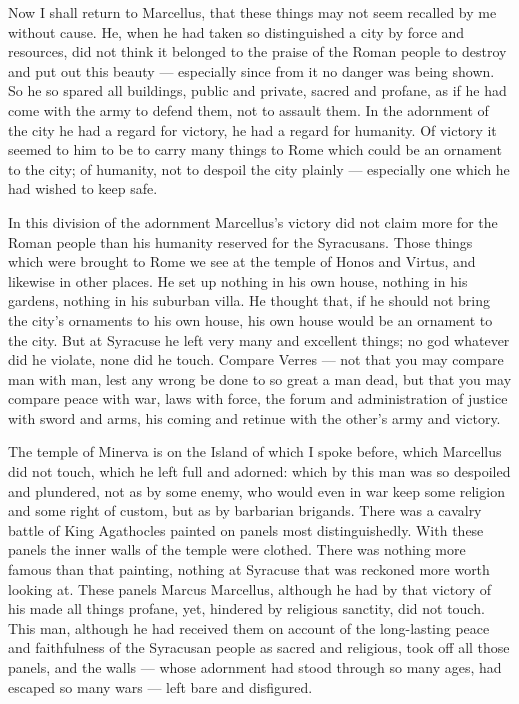  Now I shall return to Marcellus, that these things may not seem recalled by me without cause. He, when he had taken so distinguished a city by force and resources, did not think it belonged to the praise of the Roman people to destroy and put out this beauty --- especially since from it no danger was being shown. So he so spared all buildings, public and private, sacred and profane, as if he had come with the army to defend them, not to assault them. In the adornment of the city he had a regard for victory, he had a regard for humanity. Of victory it seemed to him to be to carry many things to Rome which could be an ornament to the city; of humanity, not to despoil the city plainly --- especially one which he had wished to keep safe.

 In this division of the adornment Marcellus's victory did not claim more for the Roman people than his humanity reserved for the Syracusans. Those things which were brought to Rome we see at the temple of Honos and Virtus, and likewise in other places. He set up nothing in his own house, nothing in his gardens, nothing in his suburban villa. He thought that, if he should not bring the city's ornaments to his own house, his own house would be an ornament to the city. But at Syracuse he left very many and excellent things; no god whatever did he violate, none did he touch. Compare Verres --- not that you may compare man with man, lest any wrong be done to so great a man dead, but that you may compare peace with war, laws with force, the forum and administration of justice with sword and arms, his coming and retinue with the other's army and victory.

 The temple of Minerva is on the Island of which I spoke before, which Marcellus did not touch, which he left full and adorned: which by this man was so despoiled and plundered, not as by some enemy, who would even in war keep some religion and some right of custom, but as by barbarian brigands. There was a cavalry battle of King Agathocles painted on panels most distinguishedly. With these panels the inner walls of the temple were clothed. There was nothing more famous than that painting, nothing at Syracuse that was reckoned more worth looking at. These panels Marcus Marcellus, although he had by that victory of his made all things profane, yet, hindered by religious sanctity, did not touch. This man, although he had received them on account of the long-lasting peace and faithfulness of the Syracusan people as sacred and religious, took off all those panels, and the walls --- whose adornment had stood through so many ages, had escaped so many wars --- left bare and disfigured.

